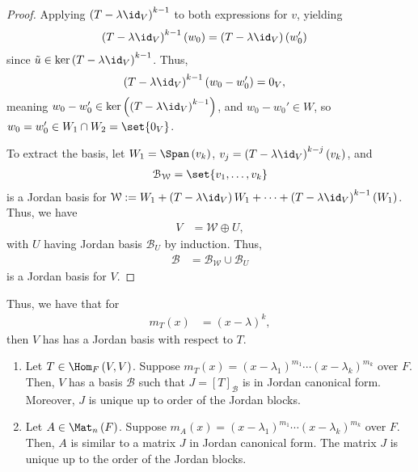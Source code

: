 \documentclass[10pt]{mypackage}
\begin{document}
\begin{proof}
  Applying $\left(T-\lambda\id_V\right)^{k-1}$ to both expressions for $v$, yielding
  \begin{align*}
    \left(T-\lambda\id_V\right)^{k-1}\left(w_0\right) &= \left(T-\lambda\id_V\right)\left(w_0'\right)
  \end{align*}
  since $\tilde{u}\in \ker\left(T-\lambda\id_V\right)^{k-1}$. Thus,
  \begin{align*}
    \left(T-\lambda\id_V\right)^{k-1}\left(w_0-w_0'\right) &= 0_V,
  \end{align*}
  meaning $w_0 - w_0'\in \ker\left(\left(T-\lambda\id_V\right)^{k-1}\right)$, and $w_0 - w_0'\in W$, so $w_0 = w_0'\in W_1\cap W_2 = \set{0_V}$.\newline

  To extract the basis, let $W_1 = \Span\left(v_k\right)$, $v_j = \left(T-\lambda\id_V\right)^{k-j}\left(v_k\right)$, and
  \begin{align*}
    \mathcal{B}_{\mathcal{W}} = \set{v_1,\dots,v_k}
  \end{align*}
  is a Jordan basis for $\mathcal{W} :=W_1 + \left(T-\lambda\id_V\right)W_1 + \cdots + \left(T-\lambda\id_V\right)^{k-1}\left(W_1\right)$. Thus, we have
  \begin{align*}
    V &= \mathcal{W}\oplus U,
  \end{align*}
  with $U$ having Jordan basis $\mathcal{B}_U$ by induction. Thus,
  \begin{align*}
    \mathcal{B} &= \mathcal{B}_{\mathcal{W}}\cup \mathcal{B}_U
  \end{align*}
  is a Jordan basis for $V$.
\end{proof}
Thus, we have that for
\begin{align*}
  m_T(x) &= \left(x-\lambda\right)^k,
\end{align*}
then $V$ has has a Jordan basis with respect to $T$.
\begin{theorem}\hfill
  \begin{enumerate}[(1)]
    \item Let $T\in \Hom_{F}\left(V,V\right)$. Suppose $m_T(x) = \left(x-\lambda_1\right)^{m_1}\cdots \left(x-\lambda_k\right)^{m_k}$ over $F$. Then, $V$ has a basis $\mathcal{B}$ such that $J = \left[T\right]_{\mathcal{B}}$ is in Jordan canonical form. Moreover, $J$ is unique up to order of the Jordan blocks.
    \item Let $A\in \Mat_{n}\left(F\right)$. Suppose $m_A(x) = \left(x-\lambda_1\right)^{m_1}\cdots \left(x-\lambda_k\right)^{m_k}$ over $F$. Then, $A$ is similar to a matrix $J$ in Jordan canonical form. The matrix $J$ is unique up to the order of the Jordan blocks.
  \end{enumerate}
\end{theorem}
\end{document}
